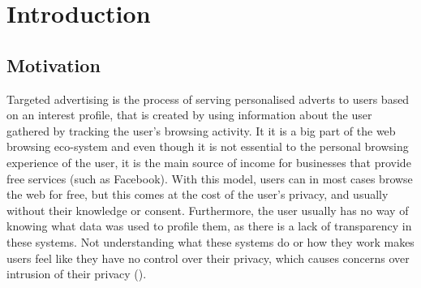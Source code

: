 \documentclass{l4proj}
\begin{document}
%
%
%
%
%
%
%
%
\chapter{Introduction}


\section{Motivation}
Targeted advertising is the process of serving personalised adverts to users based on an interest profile, that is created by using information about the user gathered by tracking the user's browsing activity. It it is a big part of the web browsing eco-system and even though it is not essential to the personal browsing experience of the user, it is the main source of income for businesses that provide free services (such as Facebook). With this model, users can in most cases browse the web for free, but this comes at the cost of the user's privacy, and usually without their knowledge or consent. Furthermore, the user usually has no way of knowing what data was used to profile them, as there is a lack of transparency in these systems. Not understanding what these systems do or how they work makes users feel like they have no control over their privacy, which causes concerns over intrusion of their privacy (\cite{intro}). 
\end{document}
